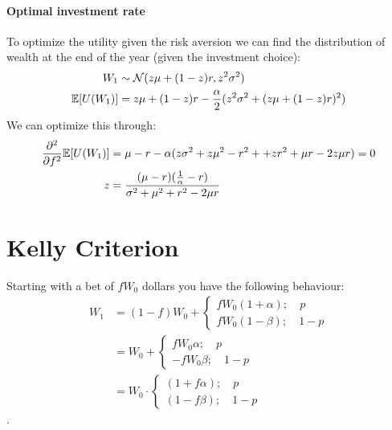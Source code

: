 \documentclass[11pt]{article}
\begin{document}
\paragraph*{Optimal investment rate}
To optimize the utility given the risk aversion we can find the distribution of wealth at the end of the year (given the investment choice):
\begin{align}
    W_1 &\sim \mathcal{N}(z\mu + (1-z)r, z^2\sigma^2) \\
    \mathbb{E}[U(W_1)] &= z\mu + (1-z)r - \frac{\alpha}{2}(z^2\sigma^2 + (z\mu + (1-z)r)^2)
\end{align}
We can optimize this through:
\begin{align}
    \frac{\partial^2}{\partial f^2}\mathbb{E}[U(W_1)] &= \mu - r - \alpha(z\sigma^2 + z\mu^2 - r^2 + + zr^2 + \mu r - 2z\mu r)  = 0\\
    z &= \frac{(\mu - r)(\frac{1}{\alpha} - r)}{\sigma^2 + \mu^2 + r^2 - 2\mu r}
\end{align}


\newpage
\section{Kelly Criterion}
Starting with a bet of $fW_0$ dollars you have the following behaviour:
\begin{align}
    W_1 &= (1 - f)W_0 + \begin{cases}
        fW_0(1 + \alpha);\quad p \\
        fW_0(1 - \beta);\quad 1-p
    \end{cases} \\
    &= W_0 + \begin{cases}
        fW_0\alpha; \quad p \\
        -fW_0\beta; \quad 1-p
    \end{cases} \\
    &= W_0 \cdot \begin{cases}
        (1 + f\alpha);\quad p\\
        (1 - f\beta); \quad 1-p
    \end{cases}
\end{align}.
\end{document}
